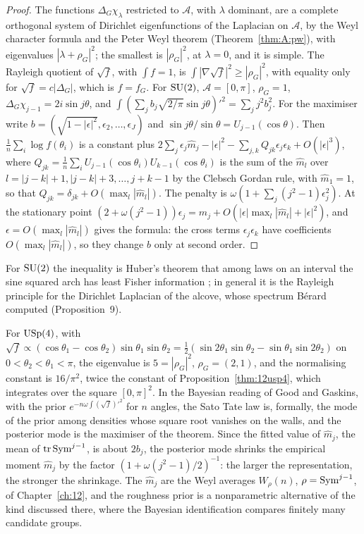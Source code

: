 \begin{proof}
The functions $\Delta_G\chi_\lambda$ restricted to $\mathcal A$, with $\lambda$ dominant, are a complete orthogonal system of Dirichlet eigenfunctions of the Laplacian on $\mathcal A$, by the Weyl character formula and the Peter Weyl theorem (Theorem~\ref{thm:A:pw}), with eigenvalues $|\lambda+\rho_G|^2$; the smallest is $|\rho_G|^2$, at $\lambda=0$, and it is simple. The Rayleigh quotient of $\sqrt f$, with $\int f=1$, is $\int|\nabla\sqrt f|^2\ge|\rho_G|^2$, with equality only for $\sqrt f=c|\Delta_G|$, which is $f=f_G$. For $\mathrm{SU}(2)$, $\mathcal A=[0,\pi]$, $\rho_G=1$, $\Delta_G\chi_{j-1}=2i\sin j\theta$, and $\int(\sum_jb_j\sqrt{2/\pi}\sin j\theta)'^2=\sum_jj^2b_j^2$. For the maximiser write $b=(\sqrt{1-|\epsilon|^2},\epsilon_2,\dots,\epsilon_J)$ and $\sin j\theta/\sin\theta=U_{j-1}(\cos\theta)$. Then $\frac1n\sum_i\log f(\theta_i)$ is a constant plus $2\sum_j\epsilon_j\hat m_j-|\epsilon|^2-\sum_{j,k}Q_{jk}\epsilon_j\epsilon_k+O(|\epsilon|^3)$, where $Q_{jk}=\frac1n\sum_iU_{j-1}(\cos\theta_i)U_{k-1}(\cos\theta_i)$ is the sum of the $\hat m_l$ over $l=|j-k|+1,|j-k|+3,\dots,j+k-1$ by the Clebsch Gordan rule, with $\hat m_1=1$, so that $Q_{jk}=\delta_{jk}+O(\max_l|\hat m_l|)$. The penalty is $\omega(1+\sum_j(j^2-1)\epsilon_j^2)$. At the stationary point $(2+\omega(j^2-1))\epsilon_j=\hat m_j+O(|\epsilon|\max_l|\hat m_l|+|\epsilon|^2)$, and $\epsilon=O(\max_l|\hat m_l|)$ gives the formula: the cross terms $\epsilon_j\epsilon_k$ have coefficients $O(\max_l|\hat m_l|)$, so they change $b$ only at second order.
\end{proof}

For $\mathrm{SU}(2)$ the inequality is Huber's theorem that among laws on an interval the sine squared arch has least Fisher information \cite{huber1974}; in general it is the Rayleigh principle for the Dirichlet Laplacian of the alcove, whose spectrum B\'erard computed \cite{berard1980} (Proposition~9).

For $\mathrm{USp}(4)$, with $\sqrt f\propto(\cos\theta_1-\cos\theta_2)\sin\theta_1\sin\theta_2=\frac12(\sin2\theta_1\sin\theta_2-\sin\theta_1\sin2\theta_2)$ on $0<\theta_2<\theta_1<\pi$, the eigenvalue is $5=|\rho_G|^2$, $\rho_G=(2,1)$, and the normalising constant is $16/\pi^2$, twice the constant of Proposition~\ref{thm:12usp4}, which integrates over the square $[0,\pi]^2$. In the Bayesian reading of Good and Gaskins, with the prior $e^{-n\omega\int(\sqrt f)'^2}$ for $n$ angles, the Sato Tate law is, formally, the mode of the prior among densities whose square root vanishes on the walls, and the posterior mode is the maximiser of the theorem. Since the fitted value of $\hat m_j$, the mean of $\operatorname{tr}\operatorname{Sym}^{j-1}$, is about $2b_j$, the posterior mode shrinks the empirical moment $\hat m_j$ by the factor $(1+\omega(j^2-1)/2)^{-1}$: the larger the representation, the stronger the shrinkage. The $\hat m_j$ are the Weyl averages $W_\rho(n)$, $\rho=\operatorname{Sym}^{j-1}$, of Chapter~\ref{ch:12}, and the roughness prior is a nonparametric alternative of the kind discussed there, where the Bayesian identification compares finitely many candidate groups.

